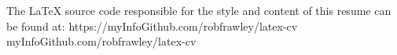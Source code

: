 

\sourceRender
	{The LaTeX source code responsible for the style and content of this resume can be found at:}
	{https://myInfoGithub.com/robfrawley/latex-cv}
	{myInfoGithub.com/robfrawley/latex-cv}

